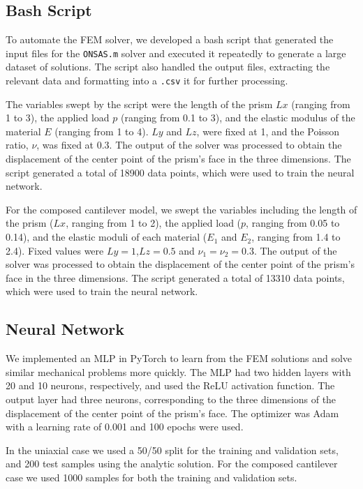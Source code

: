 \documentclass[11pt]{scrartcl} %
\begin{document}
\subsection{Bash Script}
To automate the FEM solver, we developed a bash script that generated the input files for the \texttt{ONSAS.m} solver and executed it repeatedly to generate a large dataset of solutions. The script also handled the output files, extracting the relevant data and formatting into a \texttt{.csv} it for further processing.

The variables swept by the script were the length of the prism $Lx$ (ranging from 1 to 3), the applied load $p$ (ranging from 0.1 to 3), and the elastic modulus of the material $E$ (ranging from 1 to 4). $Ly$ and $Lz$, were fixed at 1, and the Poisson ratio, $\nu$, was fixed at 0.3. The output of the solver was processed to obtain the displacement of the center point of the prism's face in the three dimensions.  The script generated a total of 18900 data points, which were used to train the neural network.

For the composed cantilever model, we swept the variables including the length of the prism ($Lx$, ranging from 1 to 2), the applied load ($p$, ranging from 0.05 to 0.14), and the elastic moduli of each material ($E_1$ and $E_2$, ranging from 1.4 to 2.4). Fixed values were $Ly=1$,$Lz=0.5$ and  $\nu_1=\nu_2=0.3$. The output of the solver was processed to obtain the displacement of the center point of the prism's face in the three dimensions. The script generated a total of 13310 data points, which were used to train the neural network.

\subsection{Neural Network}
We implemented an MLP in PyTorch to learn from the FEM solutions and solve similar mechanical problems more quickly. The MLP had two hidden layers with 20 and 10 neurons, respectively, and used the ReLU activation function. The output layer had three neurons, corresponding to the three dimensions of the displacement of the center point of the prism's face. The optimizer was Adam with a learning rate of 0.001 and 100 epochs were used. 

In the uniaxial case we used a 50/50 split for the training and validation sets, and 200 test samples using the analytic solution. For the composed cantilever case we used 1000 samples for both the training and validation sets.
\end{document}
